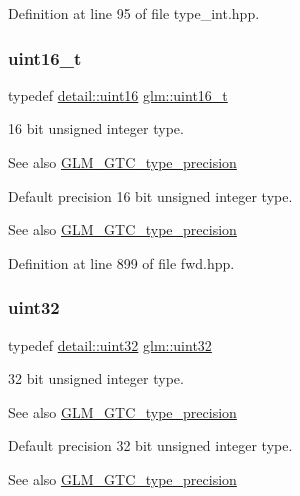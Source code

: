 Definition at line 95 of file type\+\_\+int.\+hpp.

\mbox{\label{group__gtc__type__precision_gac4eb4f43cae8129b00086dc234d3b8fc}} 
\subsubsection{\texorpdfstring{uint16\+\_\+t}{uint16\_t}}
{\footnotesize\ttfamily typedef \hyperlink{namespaceglm_1_1detail_a47b2a7d006d187338e8031a352d1ce56}{detail\+::uint16} \hyperlink{group__gtc__type__precision_gac4eb4f43cae8129b00086dc234d3b8fc}{glm\+::uint16\+\_\+t}}

16 bit unsigned integer type. \begin{DoxySeeAlso}{See also}
\hyperlink{group__gtc__type__precision}{G\+L\+M\+\_\+\+G\+T\+C\+\_\+type\+\_\+precision}
\end{DoxySeeAlso}
Default precision 16 bit unsigned integer type. \begin{DoxySeeAlso}{See also}
\hyperlink{group__gtc__type__precision}{G\+L\+M\+\_\+\+G\+T\+C\+\_\+type\+\_\+precision} 
\end{DoxySeeAlso}


Definition at line 899 of file fwd.\+hpp.

\mbox{\label{group__gtc__type__precision_ga202b6a53c105fcb7e531f9b443518451}} 
\subsubsection{\texorpdfstring{uint32}{uint32}}
{\footnotesize\ttfamily typedef \hyperlink{namespaceglm_1_1detail_ade6cfbf377022aaa391af8cd50489222}{detail\+::uint32} \hyperlink{group__gtc__type__precision_ga202b6a53c105fcb7e531f9b443518451}{glm\+::uint32}}

32 bit unsigned integer type. \begin{DoxySeeAlso}{See also}
\hyperlink{group__gtc__type__precision}{G\+L\+M\+\_\+\+G\+T\+C\+\_\+type\+\_\+precision}
\end{DoxySeeAlso}
Default precision 32 bit unsigned integer type. \begin{DoxySeeAlso}{See also}
\hyperlink{group__gtc__type__precision}{G\+L\+M\+\_\+\+G\+T\+C\+\_\+type\+\_\+precision} 
\end{DoxySeeAlso}



